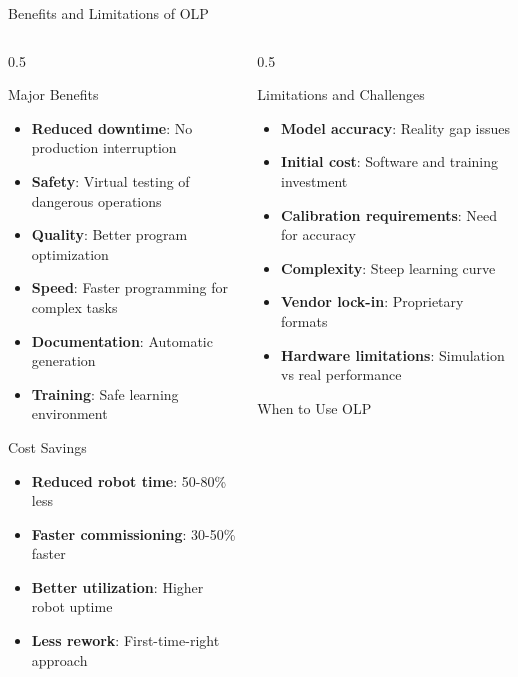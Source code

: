 \documentclass[10pt,aspectratio=169]{beamer}
\begin{document}
\begin{frame}{Benefits and Limitations of OLP}
\begin{columns}[T]
\begin{column}{0.5\textwidth}
\begin{block}{Major Benefits}
\begin{itemize}
\item \textbf{Reduced downtime}: No production interruption
\item \textbf{Safety}: Virtual testing of dangerous operations
\item \textbf{Quality}: Better program optimization
\item \textbf{Speed}: Faster programming for complex tasks
\item \textbf{Documentation}: Automatic generation
\item \textbf{Training}: Safe learning environment
\end{itemize}
\end{block}
\begin{exampleblock}{Cost Savings}
\begin{itemize}
\item \textbf{Reduced robot time}: 50-80\% less
\item \textbf{Faster commissioning}: 30-50\% faster
\item \textbf{Better utilization}: Higher robot uptime
\item \textbf{Less rework}: First-time-right approach
\end{itemize}
\end{exampleblock}
\end{column}
\begin{column}{0.5\textwidth}
\begin{block}{Limitations and Challenges}
\begin{itemize}
\item \textbf{Model accuracy}: Reality gap issues
\item \textbf{Initial cost}: Software and training investment
\item \textbf{Calibration requirements}: Need for accuracy
\item \textbf{Complexity}: Steep learning curve
\item \textbf{Vendor lock-in}: Proprietary formats
\item \textbf{Hardware limitations}: Simulation vs real performance
\end{itemize}
\end{block}
\begin{alertblock}{When to Use OLP}

\end{alertblock}
\end{column}
\end{columns}
\end{frame}
\end{document}
